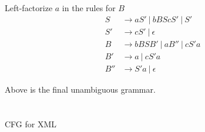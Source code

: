 \documentclass{article}
\begin{document}
Left-factorize $a$ in the rules for $B$
\begin{align*}
	S   & \rightarrow aS' ~|~ bBScS' ~|~ S'   \\
	S'  & \rightarrow cS' ~|~ \epsilon        \\
	B   & \rightarrow bBSB' ~|~ aB'' ~|~ cS'a \\
	B'  & \rightarrow a ~|~ cS'a              \\
	B'' & \rightarrow S'a ~|~ \epsilon
\end{align*}

Above is the final unambiguous grammar.

\section{}
\subsection{}
CFG for XML
\end{document}
